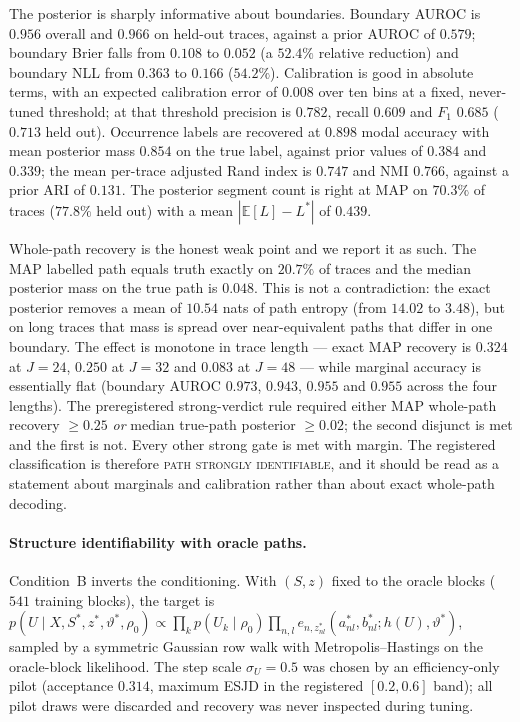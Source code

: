 The posterior is sharply informative about boundaries. Boundary AUROC is
$0.956$ overall and $0.966$ on held-out traces, against a prior AUROC of
$0.579$; boundary Brier falls from $0.108$ to $0.052$ (a $52.4\%$ relative
reduction) and boundary NLL from $0.363$ to $0.166$ ($54.2\%$). Calibration is
good in absolute terms, with an expected calibration error of $0.008$ over ten
bins at a fixed, never-tuned threshold; at that threshold precision is $0.782$,
recall $0.609$ and $F_1$ $0.685$ ($0.713$ held out). Occurrence labels are
recovered at $0.898$ modal accuracy with mean posterior mass $0.854$ on the true
label, against prior values of $0.384$ and $0.339$; the mean per-trace
adjusted Rand index is $0.747$ and NMI $0.766$, against a prior ARI of $0.131$.
The posterior segment count is right at MAP on $70.3\%$ of traces ($77.8\%$
held out) with a mean $|\mathbb{E}[L] - L^\ast|$ of $0.439$.

Whole-path recovery is the honest weak point and we report it as such. The MAP
labelled path equals truth exactly on $20.7\%$ of traces and the median
posterior mass on the true path is $0.048$. This is not a contradiction: the
exact posterior removes a mean of $10.54$ nats of path entropy (from $14.02$ to
$3.48$), but on long traces that mass is spread over near-equivalent paths that
differ in one boundary. The effect is monotone in trace length --- exact MAP
recovery is $0.324$ at $J=24$, $0.250$ at $J=32$ and $0.083$ at $J=48$ --- while
marginal accuracy is essentially flat (boundary AUROC $0.973$, $0.943$, $0.955$
and $0.955$ across the four lengths). The preregistered strong-verdict rule
required either MAP whole-path recovery $\geq 0.25$ \emph{or} median true-path
posterior $\geq 0.02$; the second disjunct is met and the first is not. Every
other strong gate is met with margin. The registered classification is therefore
\textsc{path strongly identifiable}, and it should be read as a statement about
marginals and calibration rather than about exact whole-path decoding.

\paragraph{Structure identifiability with oracle paths.}
Condition~B inverts the conditioning. With $(S,z)$ fixed to the oracle blocks
($541$ training blocks), the target is
$p(U \mid X, S^\ast, z^\ast, \vartheta^\ast, \rho_0)
\propto \prod_k p(U_k \mid \rho_0)
\prod_{n,l} e_{n, z^\ast_{nl}}(a^\ast_{nl}, b^\ast_{nl}; h(U), \vartheta^\ast)$,
sampled by a symmetric Gaussian row walk with Metropolis--Hastings on the
oracle-block likelihood. The step scale $\sigma_U = 0.5$ was chosen by an
efficiency-only pilot (acceptance $0.314$, maximum ESJD in the registered
$[0.2, 0.6]$ band); all pilot draws were discarded and recovery was never
inspected during tuning.

